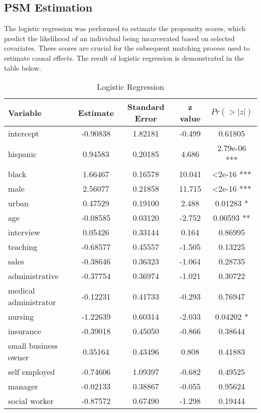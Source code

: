 \documentclass{article}[12pt]
\begin{document}
\subsection{PSM Estimation}
The logistic regression was performed to estimate the propensity scores, which predict the likelihood of an individual being incarcerated based on selected covariates. These scores are crucial for the subsequent matching process used to estimate causal effects. The result of logistic regression is demonstrated in the table below.
\par 
\begin{table}[htbp]
    \centering
    \caption{Logistic Regression}
    \label{tab: Logistic Regression}
    \begin{tabular}{lcccc}
        \toprule
        \textbf{Variable} & \textbf{Estimate} & \textbf{Standard Error} & \textbf{z value} & \textbf{$Pr(>|z|)$} \\
        \midrule
        intercept & -0.90838 & 1.82181 & -0.499 & 0.61805 \\
        hispanic & 0.94583 & 0.20185 & 4.686 &  2.79e-06 *** \\
        black & 1.66467 & 0.16578 & 10.041 & \textless 2e-16 *** \\
        male & 2.56077 & 0.21858 & 11.715 & \textless 2e-16 *** \\
        urban & 0.47529 & 0.19100 & 2.488 &  0.01283 * \\
        age & -0.08585 & 0.03120 & -2.752 & 0.00593 ** \\
        interview & 0.05426 & 0.33144 & 0.164 & 0.86995 \\
        teaching & -0.68577 & 0.45557 & -1.505 & 0.13225 \\
        sales & -0.38646 & 0.36323 & -1.064 & 0.28735 \\
        administrative & -0.37754 & 0.36974 & -1.021 & 0.30722 \\
        medical administrator & -0.12231 & 0.41733 & -0.293 & 0.76947 \\
        nursing & -1.22639 & 0.60314 & -2.033 & 0.04202 * \\
        insurance & -0.39018 & 0.45050 & -0.866 & 0.38644 \\
        small business owner & 0.35164 & 0.43496 & 0.808 & 0.41883 \\
        self employed & -0.74606 & 1.09397 & -0.682 & 0.49525 \\
        manager & -0.02133 & 0.38867 & -0.055 & 0.95624 \\
        social worker & -0.87572 & 0.67490 & -1.298 & 0.19444 \\
        \bottomrule
    \end{tabular}
\end{table}
\end{document}
